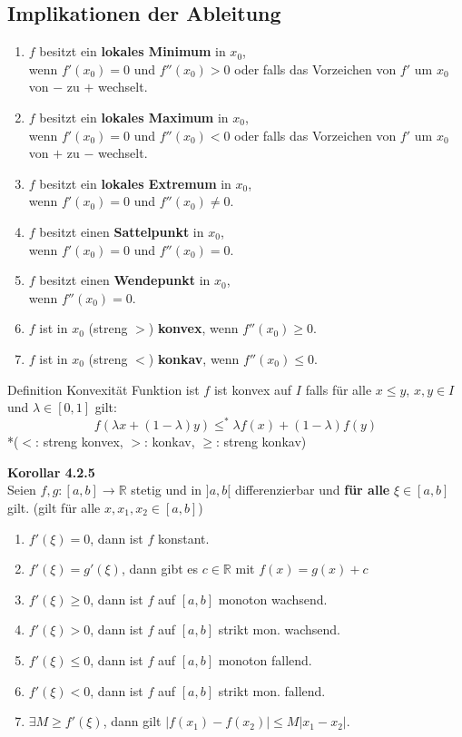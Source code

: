 \documentclass[a4paper,10pt]{article}
\begin{document}
\subsection{Implikationen der Ableitung}
\begin{enumerate}
	\item $f$ besitzt ein \textbf{lokales Minimum} in $x_0$, \\wenn $f'(x_0) = 0$ und $f''(x_0) > 0$ oder falls das Vorzeichen von $f'$ um $x_0$ von $-$ zu $+$ wechselt.
	\item $f$ besitzt ein \textbf{lokales Maximum} in $x_0$, \\wenn $f'(x_0) = 0$ und $f''(x_0) < 0$ oder falls das Vorzeichen von $f'$ um $x_0$ von $+$ zu $-$ wechselt.
	\item $f$ besitzt ein \textbf{lokales Extremum} in $x_0$, \\wenn $f'(x_0) = 0$ und $f''(x_0) \ne 0$.
	\item $f$ besitzt einen \textbf{Sattelpunkt} in $x_0$, \\wenn $f'(x_0) = 0$ und $f''(x_0) = 0$.
	\item $f$ besitzt einen \textbf{Wendepunkt} in $x_0$, \\wenn $f''(x_0) = 0$.
	\item $f$ ist in $x_0$ (streng $>$) \textbf{konvex}, wenn $f''(x_0) \ge 0$. 
	\item $f$ ist in $x_0$ (streng $<$) \textbf{konkav}, wenn $f''(x_0) \le 0$.
\end{enumerate}

\begin{subbox}{Definition Konvexität}
	Funktion ist $f$ ist konvex auf $I$ falls für alle $x\leq y$, $x,y \in I$ und $\lambda\in [0,1]$ gilt:
	$$f(\lambda x+(1-\lambda)y)\leq^*\lambda f(x)+ (1-\lambda)f(y)$$
	*($<$: streng konvex, $>$: konkav, $\geq$: streng konkav)
\end{subbox}



\noindent\textbf{Korollar 4.2.5}\\
\noindent Seien $f,g :[a,b]\to \mathbb{R}$ stetig und in $]a,b[$ differenzierbar und \textbf{für alle} $\xi \in[a,b]$ gilt. (gilt für alle $x,x_1,x_2\in [a,b]$)
\begin{enumerate}
	\item $f'(\xi)=0$, dann ist $f$ konstant.
	\item $f'(\xi)=g'(\xi)$, dann gibt es $c\in \mathbb{R}$ mit $f(x)=g(x)+c$
	\item $f'(\xi)\geq 0$, dann ist $f$ auf $[a,b]$ monoton wachsend.
	\item $f'(\xi) > 0$, dann ist $f$ auf $[a,b]$ strikt mon. wachsend.
	\item $f'(\xi)\leq 0$, dann ist $f$ auf $[a,b]$ monoton fallend.
	\item $f'(\xi) < 0$, dann ist $f$ auf $[a,b]$ strikt mon. fallend.
	\item $\exists M \geq f'(\xi)$, dann gilt $|f(x_1)-f(x_2)|\leq M|x_1-x_2|$.
\end{enumerate}
\end{document}
